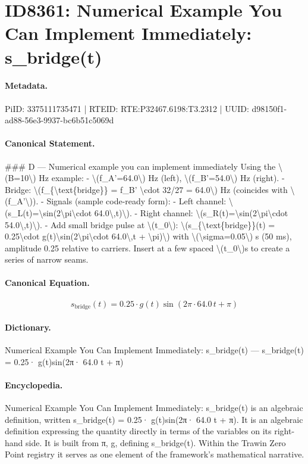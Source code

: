 \section*{ID8361: Numerical Example You Can Implement Immediately: s\_bridge(t)}
\paragraph{Metadata.}
PiID: 3375111735471 | RTEID: RTE:P32467.6198:T3.2312 | UUID: d98150f1-ad88-56e3-9937-bc6b51c5069d

\paragraph{Canonical Statement.}
\#\#\# D — Numerical example you can implement immediately Using the \textbackslash{}(B=10\textbackslash{}) Hz example: - \textbackslash{}(f\_A'=64.0\textbackslash{}) Hz (left), \textbackslash{}(f\_B'=54.0\textbackslash{}) Hz (right). - Bridge: \textbackslash{}(f\_\{\textbackslash{}text\{bridge\}\} = f\_B' \textbackslash{}cdot 32/27 = 64.0\textbackslash{}) Hz (coincides with \textbackslash{}(f\_A'\textbackslash{})). - Signals (sample code-ready form): - Left channel: \textbackslash{}(s\_L(t)=\textbackslash{}sin(2\textbackslash{}pi\textbackslash{}cdot 64.0\textbackslash{},t)\textbackslash{}). - Right channel: \textbackslash{}(s\_R(t)=\textbackslash{}sin(2\textbackslash{}pi\textbackslash{}cdot 54.0\textbackslash{},t)\textbackslash{}). - Add small bridge pulse at \textbackslash{}(t\_0\textbackslash{}): \textbackslash{}(s\_\{\textbackslash{}text\{bridge\}\}(t) = 0.25\textbackslash{}cdot g(t)\textbackslash{}sin(2\textbackslash{}pi\textbackslash{}cdot 64.0\textbackslash{},t + \textbackslash{}pi)\textbackslash{}) with \textbackslash{}(\textbackslash{}sigma=0.05\textbackslash{}) s (50 ms), amplitude 0.25 relative to carriers. Insert at a few spaced \textbackslash{}(t\_0\textbackslash{})s to create a series of narrow seams.

\paragraph{Canonical Equation.}
\[
s_{\text{bridge}}(t) = 0.25\cdot g(t)\sin(2\pi\cdot 64.0\,t + \pi)
\]

\paragraph{Dictionary.}
Numerical Example You Can Implement Immediately: s\_bridge(t) — s\_bridge(t) = 0.25· g(t)sin(2π· 64.0 t + π)

\paragraph{Encyclopedia.}
Numerical Example You Can Implement Immediately: s\_bridge(t) is an algebraic definition, written s\_bridge(t) = 0.25· g(t)sin(2π· 64.0 t + π). It is an algebraic definition expressing the quantity directly in terms of the variables on its right-hand side. It is built from π, g, defining s\_bridge(t). Within the Trawin Zero Point registry it serves as one element of the framework's mathematical narrative.
